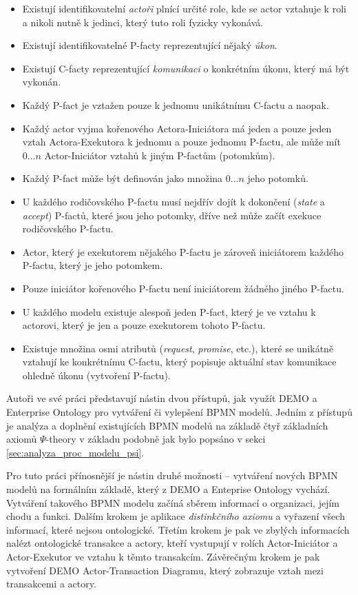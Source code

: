 \documentclass[]{article}
\newcommand{\ptheory}{$\Psi$-theory }
\begin{document}
\begin{itemize}
\item Existují identifikovatelní \textit{actoři} plnící určité role, kde se actor vztahuje k roli a nikoli nutně k jedinci, který tuto roli fyzicky vykonává.
\item Existují identifikovatelné P-facty reprezentující nějaký \textit{úkon}.
\item Existují C-facty reprezentující \textit{komunikaci} o konkrétním úkonu, který má být vykonán.
\item Každý P-fact je vztažen pouze k jednomu unikátnímu C-factu a naopak.
\item Každý actor vyjma kořenového Actora-Iniciátora má jeden a pouze jeden vztah Actora-Exekutora k jednomu a pouze jednomu P-factu, ale může mít $0...n$ Actor-Iniciátor vztahů k jiným P-factům (potomkům).
\item Každý P-fact může být definován jako množina $0...n$ jeho potomků. %
\item U každého rodičovského P-factu musí nejdřív dojít k dokončení (\textit{state} a \textit{accept}) P-factů, které jsou jeho potomky, dříve než může začít exekuce rodičovského P-factu.
\item Actor, který je exekutorem nějakého P-factu je zároveň iniciátorem každého P-factu, který je jeho potomkem.
\item Pouze iniciátor kořenového P-factu není iniciátorem žádného jiného P-factu.
\item U každého modelu existuje alespoň jeden P-fact, který je ve vztahu k actorovi, který je jen a pouze exekutorem tohoto P-factu.
\item Existuje množina osmi atributů (\textit{request}, \textit{promise}, etc.), které se unikátně vztahují ke konkrétnímu C-factu, který  popisuje aktuální stav komunikace ohledně úkonu (vytvoření P-factu).
\end{itemize}

Autoři ve své práci představují nástin dvou přístupů, jak využít DEMO a Enterprise Ontology pro vytváření či vylepšení BPMN modelů. Jedním z přístupů je analýza a doplnění existujících BPMN modelů na základě čtyř základních axiomů \ptheory v základu podobně jak bylo popsáno v sekci \ref{sec:analyza_proc_modelu_psi}. 

Pro tuto práci přínosnější je nástin druhé možnosti – vytváření nových BPMN modelů na formálním základě, který z DEMO a Enteprise Ontology vychází. Vytváření takového BPMN modelu začíná sběrem informací o organizaci, jejím chodu a funkci. Dalším krokem je aplikace \textit{distinkčního axiomu} a  vyřazení všech informací, které nejsou ontologické. Třetím krokem je pak ve zbylých informacích nalézt ontologické transakce a actory, kteří vystupují v rolích Actor-Iniciátor a Actor-Exekutor ve vztahu k těmto transakcím. Závěrečným krokem je pak vytvoření DEMO Actor-Transaction Diagramu, který zobrazuje vztah mezi transakcemi a actory. 
\end{document}
